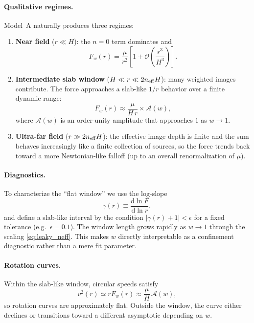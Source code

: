 \documentclass[11pt]{article}
\newcommand{\dd}{\mathrm{d}}
\begin{document}
\paragraph{Qualitative regimes.}
Model~A naturally produces three regimes:

\begin{enumerate}
\item \textbf{Near field} ($r\ll H$): the $n=0$ term dominates and
\begin{equation}
  F_w(r) = \frac{\mu}{r^2}\left[1+\mathcal{O}\!\left(\frac{r^3}{H^3}\right)\right].
\end{equation}

\item \textbf{Intermediate slab window} ($H\ll r\ll 2n_{\rm eff}H$): many weighted images contribute.
The force approaches a slab-like $1/r$ behavior over a finite dynamic range:
\begin{equation}
  F_w(r)\approx \frac{\mu}{H\,r}\times \mathcal{A}(w),
\end{equation}
where $\mathcal{A}(w)$ is an order-unity amplitude that approaches $1$ as $w\to 1$.

\item \textbf{Ultra-far field} ($r\gg 2n_{\rm eff}H$): the effective image depth is finite and the
sum behaves increasingly like a finite collection of sources, so the force trends back toward a
more Newtonian-like falloff (up to an overall renormalization of $\mu$).
\end{enumerate}

\paragraph{Diagnostics.}
To characterize the ``flat window'' we use the log-slope
\begin{equation}
  \gamma(r) \equiv \frac{\dd\ln F}{\dd\ln r},
\end{equation}
and define a slab-like interval by the condition $|\gamma(r)+1|<\epsilon$ for a fixed tolerance
(e.g.\ $\epsilon=0.1$).  The window length grows rapidly as $w\to 1$ through the scaling
\eqref{eq:leaky_neff}.  This makes $w$ directly interpretable as a confinement diagnostic rather than
a mere fit parameter.

\paragraph{Rotation curves.}
Within the slab-like window, circular speeds satisfy
\begin{equation}
  v^2(r)\simeq rF_w(r)\approx \frac{\mu}{H}\,\mathcal{A}(w),
\end{equation}
so rotation curves are approximately flat.  Outside the window, the curve either declines or
transitions toward a different asymptotic depending on $w$.
\end{document}
